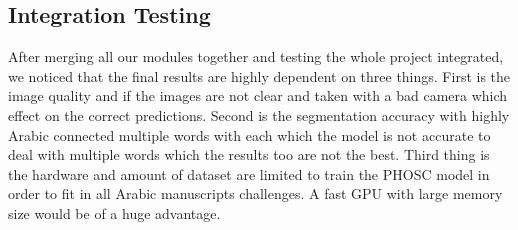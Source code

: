 \subsection{Integration Testing}
After merging all our modules together and testing the whole project integrated, we noticed that the final results are highly dependent on three things. First is the image quality and if the images are not clear and taken with a bad camera which effect on the correct predictions. Second is the segmentation accuracy with highly Arabic connected multiple words with each which the model is not accurate to deal with multiple words which the results too are not the best. Third thing is the hardware and amount of dataset are limited to train the PHOSC model in order to fit in all Arabic manuscripts challenges. A fast GPU with large memory size would be of a huge advantage.